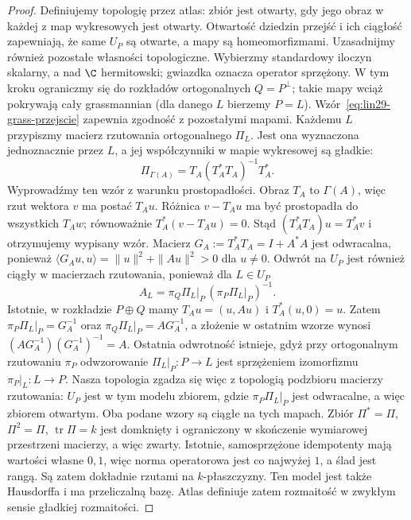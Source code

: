 \begin{proof}
Definiujemy topologię przez atlas: zbiór jest otwarty, gdy
jego obraz w każdej z map wykresowych jest otwarty.
Otwartość dziedzin przejść i ich ciągłość zapewniają, że
same $U_P$ są otwarte, a mapy są homeomorfizmami.
Uzasadnijmy również pozostałe własności topologiczne.
Wybierzmy standardowy iloczyn skalarny, a nad $\C$ hermitowski;
gwiazdka oznacza operator sprzężony. W tym kroku
ograniczmy się do rozkładów ortogonalnych $Q=P^\perp$;
takie mapy wciąż pokrywają cały grassmannian
(dla danego $L$ bierzemy $P=L$).
Wzór~\eqref{eq:lin29-grass-przejscie} zapewnia zgodność
z pozostałymi mapami. Każdemu $L$
przypiszmy macierz rzutowania ortogonalnego $\Pi_L$.
Jest ona wyznaczona jednoznacznie przez $L$, a jej
współczynniki w mapie wykresowej są gładkie:
\[
 \Pi_{\Gamma(A)}
  =T_A(T_A^*T_A)^{-1}T_A^*.
\]
Wyprowadźmy ten wzór z warunku prostopadłości.
Obraz $T_A$ to $\Gamma(A)$, więc rzut wektora $v$ ma postać
$T_Au$. Różnica $v-T_Au$ ma być prostopadła do wszystkich
$T_Aw$; równoważnie $T_A^*(v-T_Au)=0$.
Stąd $(T_A^*T_A)u=T_A^*v$ i otrzymujemy wypisany wzór.
Macierz $G_A:=T_A^*T_A=I+A^*A$ jest odwracalna, ponieważ
$\langle G_Au,u\rangle=\|u\|^2+\|Au\|^2>0$ dla $u\ne0$.
Odwrót na $U_P$ jest również ciągły w macierzach
rzutowania, ponieważ dla $L\in U_P$
\[
 A_L=\pi_Q\Pi_L|_P\,(\pi_P\Pi_L|_P)^{-1}.
\]
Istotnie, w rozkładzie $P\oplus Q$ mamy
$T_Au=(u,Au)$ i $T_A^*(u,0)=u$.
Zatem $\pi_P\Pi_L|_P=G_A^{-1}$ oraz
$\pi_Q\Pi_L|_P=AG_A^{-1}$, a złożenie w ostatnim wzorze
wynosi $(AG_A^{-1})(G_A^{-1})^{-1}=A$.
Ostatnia odwrotność istnieje, gdyż przy ortogonalnym
rzutowaniu $\pi_P$ odwzorowanie $\Pi_L|_P:P\to L$
jest sprzężeniem izomorfizmu
$\pi_P|_L:L\to P$. Nasza topologia zgadza się więc
z topologią podzbioru macierzy rzutowania: $U_P$ jest w tym
modelu zbiorem, gdzie $\pi_P\Pi_L|_P$ jest odwracalne,
a więc zbiorem otwartym. Oba podane wzory są ciągłe na tych mapach.
Zbiór $\Pi^*=\Pi$, $\Pi^2=\Pi$, $\operatorname{tr}\Pi=k$
jest domknięty i ograniczony w skończenie wymiarowej
przestrzeni macierzy, a więc zwarty. Istotnie, samosprzężone
idempotenty mają wartości własne $0,1$, więc norma operatorowa
jest co najwyżej $1$, a ślad jest rangą. Są zatem dokładnie
rzutami na $k$-płaszczyzny. Ten model jest także
Hausdorffa i ma przeliczalną bazę. Atlas definiuje
zatem rozmaitość w zwykłym sensie gładkiej rozmaitości.
\end{proof}

